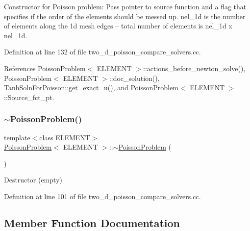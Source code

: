 Constructor for Poisson problem\+: Pass pointer to source function and a flag that specifies if the order of the elements should be messed up. nel\+\_\+1d is the number of elements along the 1d mesh edges -- total number of elements is nel\+\_\+1d x nel\+\_\+1d. 

Definition at line 132 of file two\+\_\+d\+\_\+poisson\+\_\+compare\+\_\+solvers.\+cc.



References Poisson\+Problem$<$ E\+L\+E\+M\+E\+N\+T $>$\+::actions\+\_\+before\+\_\+newton\+\_\+solve(), Poisson\+Problem$<$ E\+L\+E\+M\+E\+N\+T $>$\+::doc\+\_\+solution(), Tanh\+Soln\+For\+Poisson\+::get\+\_\+exact\+\_\+u(), and Poisson\+Problem$<$ E\+L\+E\+M\+E\+N\+T $>$\+::\+Source\+\_\+fct\+\_\+pt.

\mbox{\label{classPoissonProblem_ac247e42d2d292200617f4b9db7ed1ab8}} 
\subsubsection{\texorpdfstring{$\sim$\+Poisson\+Problem()}{~PoissonProblem()}\hspace{0.1cm}{\footnotesize\ttfamily [3/3]}}
{\footnotesize\ttfamily template$<$class E\+L\+E\+M\+E\+NT$>$ \\
\hyperlink{classPoissonProblem}{Poisson\+Problem}$<$ E\+L\+E\+M\+E\+NT $>$\+::$\sim$\hyperlink{classPoissonProblem}{Poisson\+Problem} (\begin{DoxyParamCaption}{ }\end{DoxyParamCaption})\hspace{0.3cm}{\ttfamily [inline]}}



Destructor (empty) 



Definition at line 101 of file two\+\_\+d\+\_\+poisson\+\_\+compare\+\_\+solvers.\+cc.



\subsection{Member Function Documentation}
\mbox{\label{classPoissonProblem_a7a9478d8e1e5c7d3a886b00ab7d50bbd}} 
